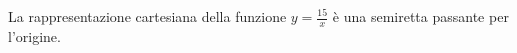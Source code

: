 La rappresentazione cartesiana della funzione \(y=\frac{15} x\) è una semiretta passante per l’origine.